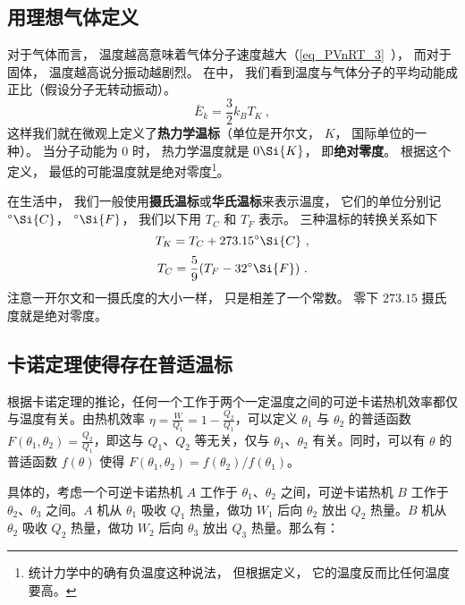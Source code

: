 

\subsection{用理想气体定义}
对于气体而言， 温度越高意味着气体分子速度越大（\autoref{eq_PVnRT_3}~）， 而对于固体， 温度越高说分振动越剧烈。 在中， 我们看到温度与气体分子的平均动能成正比（假设分子无转动振动）。
\begin{equation}
\bar E_k = \frac{3}{2} k_B T_K~,
\end{equation}
这样我们就在微观上定义了\textbf{热力学温标}（单位是开尔文， $K$， 国际单位的一种）。 当分子动能为 0 时， 热力学温度就是 $0 \Si{K}$， 即\textbf{绝对零度}。 根据这个定义， 最低的可能温度就是绝对零度\footnote{统计力学中的确有负温度这种说法， 但根据定义， 它的温度反而比任何温度要高。}。

在生活中， 我们一般使用\textbf{摄氏温标}或\textbf{华氏温标}来表示温度， 它们的单位分别记 $^\circ\Si{C}$， $^\circ\Si{F}$， 我们以下用 $T_C$ 和 $T_F$ 表示。 三种温标的转换关系如下
\begin{equation}
T_K = T_C + 273.15^\circ\Si{C}~,
\end{equation}
\begin{equation}
T_C = \frac{5}{9}(T_F - 32^\circ\Si{F})~.
\end{equation}
注意一开尔文和一摄氏度的大小一样， 只是相差了一个常数。 零下 $273.15$ 摄氏度就是绝对零度。

\subsection{卡诺定理使得存在普适温标}
根据卡诺定理的推论，任何一个工作于两个一定温度之间的可逆卡诺热机效率都仅与温度有关。由热机效率 $\eta = \frac{W}{Q_1}=1-\frac{Q_2}{Q_1}$，可以定义 $\theta_1$ 与 $\theta_2$ 的普适函数 $F(\theta_1, \theta_2) = \frac{Q_2}{Q_1}$，即这与 $Q_1$、$Q_2$ 等无关，仅与 $\theta_1$、$\theta_2$ 有关。同时，可以有 $\theta$ 的普适函数 $f(\theta)$ 使得 $F(\theta_1, \theta_2) = f(\theta_2)/f(\theta_1)$。

具体的，考虑一个可逆卡诺热机 $A$ 工作于 $\theta_1$、$\theta_2$ 之间，可逆卡诺热机 $B$ 工作于 $\theta_2$、$\theta_3$ 之间。$A$ 机从 $\theta_1$ 吸收 $Q_1$ 热量，做功 $W_1$ 后向 $\theta_2$ 放出 $Q_2$ 热量。$B$ 机从 $\theta_2$ 吸收 $Q_2$ 热量，做功 $W_2$ 后向 $\theta_3$ 放出 $Q_3$ 热量。那么有：

